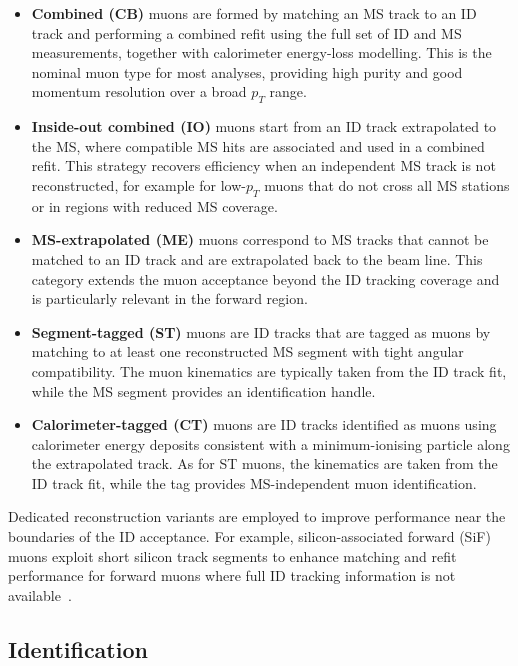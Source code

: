\begin{itemize}
  \item \textbf{Combined (CB)} muons are formed by matching an MS track to an ID
  track and performing a combined refit using the full set of ID and MS
  measurements, together with calorimeter energy-loss modelling.
  This is the nominal muon type for most analyses, providing high purity and good
  momentum resolution over a broad $p_T$ range.

  \item \textbf{Inside-out combined (IO)} muons start from an ID track extrapolated
  to the MS, where compatible MS hits are associated and used in a combined
  refit.
  This strategy recovers efficiency when an independent MS track is not
  reconstructed, for example for low-$p_T$ muons that do not cross all MS stations
  or in regions with reduced MS coverage.

  \item \textbf{MS-extrapolated (ME)} muons correspond to MS tracks that cannot be
  matched to an ID track and are extrapolated back to the beam line.
  This category extends the muon acceptance beyond the ID tracking coverage and
  is particularly relevant in the forward region.

  \item \textbf{Segment-tagged (ST)} muons are ID tracks that are tagged as muons
  by matching to at least one reconstructed MS segment with tight angular
  compatibility.
  The muon kinematics are typically taken from the ID track fit, while the MS
  segment provides an identification handle.

  \item \textbf{Calorimeter-tagged (CT)} muons are ID tracks identified as muons
  using calorimeter energy deposits consistent with a minimum-ionising particle
  along the extrapolated track.
  As for ST muons, the kinematics are taken from the ID track fit, while the tag
  provides MS-independent muon identification.
\end{itemize}

Dedicated reconstruction variants are employed to improve performance near the
boundaries of the ID acceptance.
For example, silicon-associated forward (SiF) muons exploit short silicon track
segments to enhance matching and refit performance for forward muons where full
ID tracking information is not available~\cite{ATLASMuonReco2021}.

\subsection{Identification}

